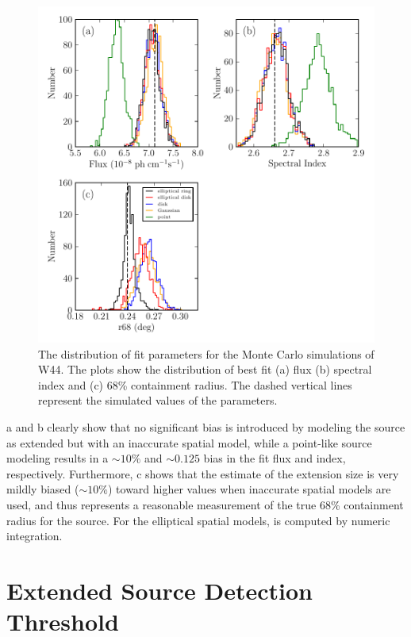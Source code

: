 \begin{figure}[htbp]
  \includegraphics{chapters/extended_analysis/figures/mc_plots/bias_w44sim_color.pdf}
  \caption{The distribution of fit parameters for the Monte Carlo
  simulations of W44.  The plots show the distribution of best fit (a)
  flux (b) spectral index and (c) 68\% containment radius. The dashed
  vertical lines represent the simulated values of the parameters.}
\end{figure}

a and b clearly show that no
significant bias is introduced by modeling the source as extended but with
an inaccurate spatial model, while a point-like source modeling results in
a $\sim10\%$ and $\sim0.125$ bias in the fit flux and index, respectively.
Furthermore, c shows that the \rsixeight estimate of
the extension size is very mildly biased ($\sim10\%$) toward higher values
when inaccurate spatial models are used, and thus represents a reasonable
measurement of the true 68\% containment radius for the source.  For the
elliptical spatial models, \rsixeight is computed by numeric integration.

\section{Extended Source Detection Threshold}

